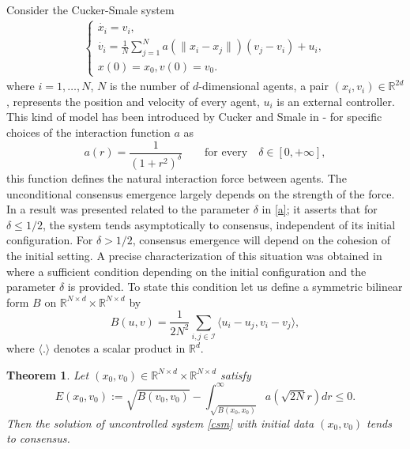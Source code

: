 \documentclass[a4paper, english]{article}
\newcommand{\D}{\displaystyle}
\newtheorem{theo}{Theorem}[section]
\begin{document}
Consider the Cucker-Smale system
\begin{align}
\begin{cases}
\D
\dot{x_i} = v_i,\\
\dot{v_i} = \frac{1}{N}\sum_{j=1}^{N}a(\|x_i - x_j\|)(v_j - v_i) + u_i, \\
x(0) = x_0,
v(0) = v_0.
\end{cases}
\label{csm}
\end{align}
where $i =1, \dots, N$, $N$ is the number of  $d$-dimensional agents, a pair $(x_i, v_i)\in \mathbb{R}^{2d}$, represents the position and velocity of every agent, $u_i$ is an external controller. This kind of model has been introduced by Cucker and Smale in \cite{cs1} - \cite{cs2} for specific choices of the interaction function $a$ as
\begin{equation}
a(r) = \frac{1}{(1 + r^2)^\delta} \qquad \mbox{for every}\quad \delta \in [0, +\infty],
\label{a}
\end{equation}
this function defines the natural interaction force between agents. The unconditional consensus emergence largely depends on the strength of the force. In \cite{cs2} a result was presented related to the parameter $\delta$ in \eqref{a}; it asserts that for $\delta \leq 1/2$, the system tends asymptotically to consensus, independent of its initial configuration. For $\delta > 1/2$, consensus emergence will depend on the cohesion of the initial setting. A precise characterization of this situation was obtained in \cite{theorem11} where a sufficient condition depending on the initial configuration and the parameter $\delta$ is provided. To state this condition let us define a symmetric bilinear form $B$ on $\mathbb{R}^{N\times d} \times  \mathbb{R}^{N\times d}$ by
\begin{equation}
B(u, v) = \frac{1}{2N^2}\sum_{i, j \in \mathcal{I}} \langle u_i - u_j, v_i - v_j  \rangle,
\label{b}
\end{equation}
where $\langle . \rangle$ denotes a scalar product in $\mathbb{R}^d$.
\begin{theo}
Let $(x_0, v_0) \in \mathbb{R}^{N\times d} \times  \mathbb{R}^{N\times d}$ satisfy
\begin{equation}
E(x_0, v_0):=\sqrt{B(v_0, v_0)} - \int_{\sqrt{B(x_0, x_0)}}^{\infty} a(\sqrt{2N}r)dr \leq 0.
\label{cq}
\end{equation}
Then the solution of uncontrolled system \eqref{csm} with initial data $(x_0, v_0)$  tends to consensus.
\end{theo}
\end{document}
